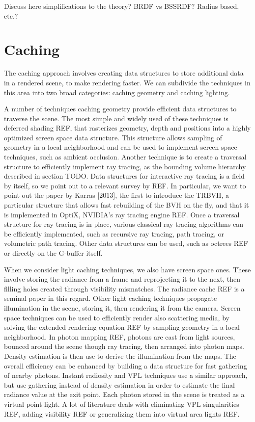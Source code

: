 Discuss here simplifications to the theory? BRDF vs BSSRDF? Radius based, etc.?

\section{Caching}

The caching approach involves creating data structures to store additional data in a rendered scene, to make rendering faster. We can subdivide the techniques in this area into two broad categories: caching geometry and caching lighting.

A number of techniques caching geometry provide efficient data structures to traverse the scene. The most simple and widely used of these techniques is deferred shading REF, that rasterizes geometry, depth and positions into a highly optimized screen space data structure. This structure allows sampling of geometry in a local neighborhood and can be used to implement screen space techniques, such as ambient occlusion. Another technique is to create a traversal structure to efficiently implement ray tracing, as the bounding volume hierarchy described in section TODO. Data structures for interactive ray tracing is a field by itself, so we point out to a relevant survey by REF. In particular, we want to point out the paper by Karras [2013], the first to introduce the TRBVH, a particular structure that allows fast rebuilding of the BVH on the fly, and that it is implemented in OptiX, NVIDIA's ray tracing engine REF. Once a traversal structure for ray tracing is in place, various classical ray tracing algorithms can be efficiently implemented, such as recursive ray tracing, path tracing, or volumetric path tracing. Other data structures can be used, such as octrees REF or directly on the G-buffer itself.

When we consider light caching techniques, we also have screen space ones. These involve storing the radiance from a frame and reprojecting it to the next, then filling holes created through visibility mismatches. The radiance cache REF is a seminal paper in this regard. Other light caching techniques propagate illumination in the scene, storing it, then rendering it from the camera. Screen space techniques can be used to efficiently render also scattering media, by solving the extended rendering equation REF by sampling geometry in a local neighborhood. In photon mapping REF, photons are cast from light sources, bounced around the scene though ray tracing, then arranged into photon maps. Density estimation is then use to derive the illumination from the maps. The overall efficiency can be enhanced by building a data structure for fast gathering of nearby photons. Instant radiosity and VPL techniques use a similar approach, but use gathering instead of density estimation in order to estimate the final radiance value at the exit point. Each photon stored in the scene is treated as a virtual point light. A lot of literature deals with eliminating VPL singularities REF, adding visibility REF or generalizing them into virtual area lights REF.

